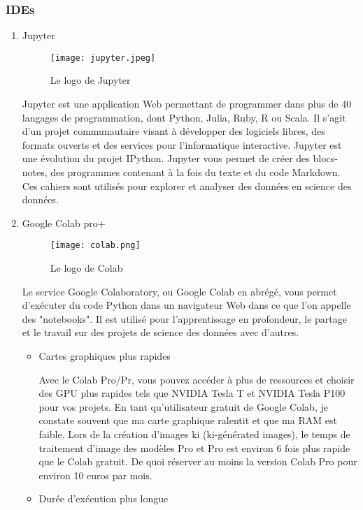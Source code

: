    \subsubsection{IDEs}
    \begin{enumerate}\bfseries
        \item Jupyter
        \begin{figure}[H]
            \centering
            \texttt{[image: jupyter.jpeg]}
            \caption{Le logo de Jupyter}\label{fig:jupyter}
        \end{figure}
        \normalfont
        Jupyter est une application Web permettant de programmer dans plus de 40 langages de programmation, dont Python, Julia, Ruby, R ou  Scala. Il s'agit d'un projet communautaire visant à développer des logiciels libres, des formats ouverts et des services pour l'informatique interactive. Jupyter est une évolution du projet IPython. Jupyter vous permet de créer des blocs-notes, des programmes contenant à la fois du texte  et du code Markdown. Ces cahiers sont utilisés  pour explorer et analyser des données en science des données.

        \bfseries
        \item Google Colab pro+
        \begin{figure}[H]
            \centering
            \texttt{[image: colab.png]}
            \caption{Le logo de Colab}\label{fig:colab}
        \end{figure}
        \normalfont
        Le service Google Colaboratory, ou Google Colab en abrégé, vous permet d'exécuter du code Python dans un navigateur Web dans ce que l'on appelle des "notebooks". Il est utilisé pour l'apprentissage en profondeur, le partage et le travail sur des projets de science des données avec d'autres.
        \begin{itemize}[label=$\bullet$]
            \item Cartes graphiques plus rapides
            
            Avec le Colab Pro/Pr, vous pouvez accéder à plus de ressources et  choisir des GPU plus rapides tels que NVIDIA Tesla T
            et NVIDIA Tesla P100 pour vos projets. En tant qu'utilisateur gratuit de Google Colab, je constate souvent que ma carte graphique ralentit et que ma RAM est faible. Lors de la création d'images ki (ki-générated images), le temps de traitement d'image des modèles Pro et Pro est environ 6 fois plus rapide que  le Colab gratuit. De quoi réserver au moins la version Colab Pro pour environ 10 euros par mois. 
            \item Durée d'exécution plus longue 
            

\end{itemize}
\end{enumerate}
